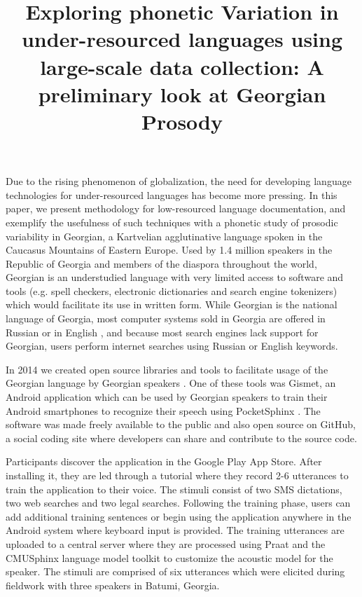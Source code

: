 \documentclass[12pt]{amsart}
\begin{document}
\title{ E\MakeLowercase{xploring} p\MakeLowercase{honetic} V\MakeLowercase{ariation} \MakeLowercase{in} u\MakeLowercase{nder}-r\MakeLowercase{esourced} l\MakeLowercase{anguages} u\MakeLowercase{sing} l\MakeLowercase{arge}-s\MakeLowercase{cale} d\MakeLowercase{ata} c\MakeLowercase{ollection}: A p\MakeLowercase{reliminary} l\MakeLowercase{ook} \MakeLowercase{at} G\MakeLowercase{eorgian} P\MakeLowercase{rosody} }
\maketitle

\vspace{-0.05in}

Due to the rising phenomenon of globalization, the need for developing language technologies for under-resourced languages has become more pressing. In this paper, we present methodology for low-resourced language documentation, and exemplify the usefulness of such techniques with a phonetic study of prosodic variability in Georgian, a Kartvelian agglutinative language spoken in the Caucasus Mountains of Eastern Europe. Used by 1.4 million speakers in the Republic of Georgia and members of the diaspora throughout the world, Georgian is an understudied language with very limited access to software and tools (e.g. spell checkers, electronic dictionaries and search engine tokenizers) which would facilitate its use in written form. While Georgian is the national language of Georgia, most computer systems sold in Georgia are offered in Russian or in English \cite{Sh}, and because most search engines lack support for Georgian, users perform internet searches using Russian or English keywords.

In 2014 we created open source libraries and tools to facilitate usage of the Georgian language by Georgian speakers \cite{Du}. One of these tools was Gismet, an Android application which can be used by Georgian speakers to train their Android smartphones to recognize their speech using PocketSphinx \cite{Hu}. The software was made freely available to the public and also open source on GitHub, a social coding site where developers can share and contribute to the source code.

Participants discover the application in the Google Play App Store. After installing it, they are led through a tutorial where they record 2-6 utterances to train the application to their voice. The stimuli consist of two SMS dictations, two web searches and two legal searches. Following the training phase, users can add additional training sentences or begin using the application anywhere in the Android system where keyboard input is provided. The training utterances are uploaded to a central server where they are processed using Praat and the CMUSphinx language model toolkit \cite{Wa} to customize the acoustic model for the speaker. The stimuli are comprised of six utterances which were elicited during fieldwork with three speakers in Batumi, Georgia.
\end{document}
